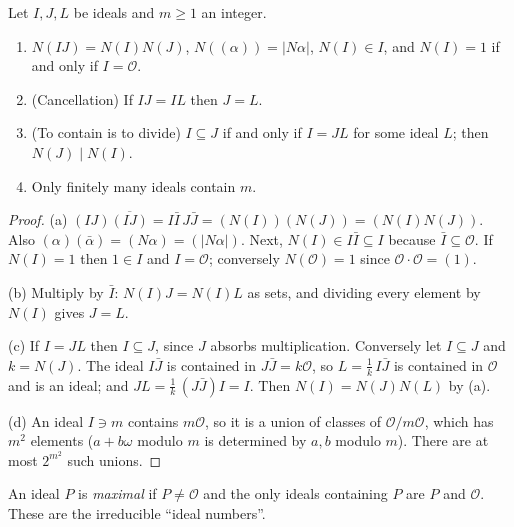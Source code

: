 \begin{proposition}\label{prop:idealrules}
Let $I,J,L$ be ideals and $m\ge1$ an integer.
\begin{enumerate}[label=(\alph*)]
\item $N(IJ)=N(I)N(J)$, $N((\alpha))=|N\alpha|$, $N(I)\in I$, and $N(I)=1$ if and only if $I=\mathcal O$.
\item (Cancellation) If $IJ=IL$ then $J=L$.
\item (To contain is to divide) $I\subseteq J$ if and only if $I=JL$ for some ideal $L$; then $N(J)\mid N(I)$.
\item Only finitely many ideals contain $m$.
\end{enumerate}
\end{proposition}
\begin{proof}
(a) $(IJ)\overline{(IJ)}=I\bar I\,J\bar J=(N(I))(N(J))=(N(I)N(J))$. Also $(\alpha)(\bar\alpha)=(N\alpha)=(|N\alpha|)$. Next, $N(I)\in I\bar I\subseteq I$ because $\bar I\subseteq\mathcal O$. If $N(I)=1$ then $1\in I$ and $I=\mathcal O$; conversely $N(\mathcal O)=1$ since $\mathcal O\cdot\mathcal O=(1)$.

(b) Multiply by $\bar I$: $N(I)J=N(I)L$ as sets, and dividing every element by $N(I)$ gives $J=L$.

(c) If $I=JL$ then $I\subseteq J$, since $J$ absorbs multiplication. Conversely let $I\subseteq J$ and $k=N(J)$. The ideal $I\bar J$ is contained in $J\bar J=k\mathcal O$, so $L=\frac1k\,I\bar J$ is contained in $\mathcal O$ and is an ideal; and $JL=\frac1k\,(J\bar J)I=I$. Then $N(I)=N(J)N(L)$ by (a).

(d) An ideal $I\ni m$ contains $m\mathcal O$, so it is a union of classes of $\mathcal O/m\mathcal O$, which has $m^2$ elements ($a+b\omega$ modulo $m$ is determined by $a,b$ modulo $m$). There are at most $2^{m^2}$ such unions.
\end{proof}

An ideal $P$ is \emph{maximal} if $P\ne\mathcal O$ and the only ideals containing $P$ are $P$ and $\mathcal O$. These are the irreducible ``ideal numbers''.

